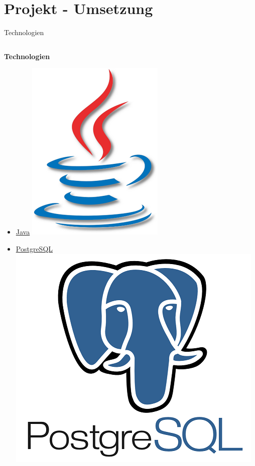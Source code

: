 \documentclass[ucs,9pt]{beamer}
\begin{document}
\section{Projekt - Umsetzung}
\begin{frame}{Technologien}
	\begin{columns}[c] %
  		\begin{column}[T]{0.49\textwidth} %
			\textbf{Technologien}
			\begin{itemize}
				\item \href{http://www.java.com/en/}{Java} \includegraphics[scale=0.08]{javalogo.png}
				\item \href{http://www.postgresql.org/}{PostgreSQL} \includegraphics[scale=0.08]{postgresqllogo.png}

\end{itemize}
\end{column}
\end{columns}
\end{frame}
\end{document}
